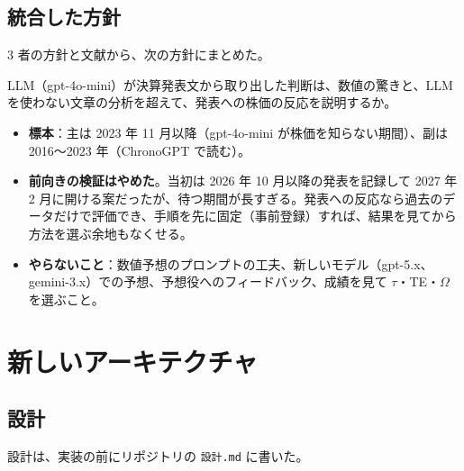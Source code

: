 \documentclass[xelatex,ja=standard,jafont=haranoaji,a4paper,10pt]{bxjsreport}
\newcommand{\code}[1]{\texttt{#1}}
\begin{document}
\chapter{統合した方針}\label{ch:plan}

3 者の方針と文献から、次の方針にまとめた。

\begin{verdict}[研究の主な問い]
LLM（gpt-4o-mini）が決算発表文から取り出した判断は、数値の驚きと、LLM を使わない文章の分析を超えて、発表への株価の反応を説明するか。
\end{verdict}

\begin{itemize}
\item \textbf{標本}：主は 2023 年 11 月以降（gpt-4o-mini が株価を知らない期間）、副は 2016〜2023 年（ChronoGPT で読む）。
\item \textbf{前向きの検証はやめた}。当初は 2026 年 10 月以降の発表を記録して 2027 年 2 月に開ける案だったが、待つ期間が長すぎる。発表への反応なら過去のデータだけで評価でき、手順を先に固定（事前登録）すれば、結果を見てから方法を選ぶ余地もなくせる。
\item \textbf{やらないこと}：数値予想のプロンプトの工夫、新しいモデル（gpt-5.x、gemini-3.x）での予想、予想役へのフィードバック、成績を見て $\tau$・TE・$\Omega$ を選ぶこと。
\end{itemize}

\part{新しいアーキテクチャ}

\chapter{設計}\label{ch:design}

設計は、実装の前にリポジトリの \code{設計.md} に書いた。
\end{document}
